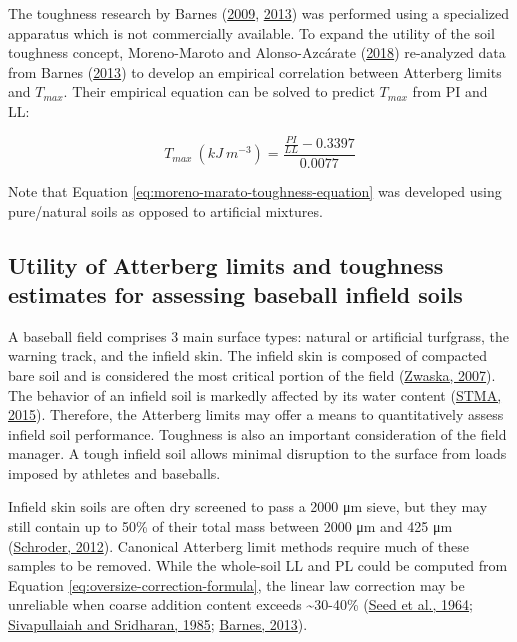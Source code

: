 \documentclass[
  letterpaper,
]{article}
\begin{document}
The toughness research by Barnes (\protect\hyperlink{ref-Barnes2009}{2009}, \protect\hyperlink{ref-Barnes2013}{2013}) was performed using a specialized apparatus which is not commercially available.
To expand the utility of the soil toughness concept, Moreno-Maroto and Alonso-Azcárate (\protect\hyperlink{ref-Moreno-Maroto2018}{2018}) re-analyzed data from Barnes (\protect\hyperlink{ref-Barnes2013}{2013}) to develop an empirical correlation between Atterberg limits and \(T_{max}\).
Their empirical equation can be solved to predict \(T_{max}\) from PI and LL:

\begin{equation}
T_{max}~(kJ~m^{-3}) = \frac{\frac{PI}{LL}-0.3397}{0.0077}
\label{eq:moreno-marato-toughness-equation}
\end{equation}

Note that Equation \eqref{eq:moreno-marato-toughness-equation} was developed using pure/natural soils as opposed to artificial mixtures.

\hypertarget{utility-of-atterberg-limits-and-toughness-estimates-for-assessing-baseball-infield-soils}{%
\subsection{Utility of Atterberg limits and toughness estimates for assessing baseball infield soils}\label{utility-of-atterberg-limits-and-toughness-estimates-for-assessing-baseball-infield-soils}}

A baseball field comprises 3 main surface types: natural or artificial turfgrass, the warning track, and the infield skin.
The infield skin is composed of compacted bare soil and is considered the most critical portion of the field (\protect\hyperlink{ref-Zwaska2007b}{Zwaska, 2007}).
The behavior of an infield soil is markedly affected by its water content (\protect\hyperlink{ref-STMA2015}{STMA, 2015}).
Therefore, the Atterberg limits may offer a means to quantitatively assess infield soil performance.
Toughness is also an important consideration of the field manager.
A tough infield soil allows minimal disruption to the surface from loads imposed by athletes and baseballs.

Infield skin soils are often dry screened to pass a 2000 μm sieve, but they may still contain up to 50\% of their total mass between 2000 μm and 425 μm (\protect\hyperlink{ref-Schroder2012}{Schroder, 2012}).
Canonical Atterberg limit methods require much of these samples to be removed.
While the whole-soil LL and PL could be computed from Equation \eqref{eq:oversize-correction-formula}, the linear law correction may be unreliable when coarse addition content exceeds \textasciitilde30-40\% (\protect\hyperlink{ref-Seed1964a}{Seed et al., 1964}; \protect\hyperlink{ref-Sivapullaiah1985}{Sivapullaiah and Sridharan, 1985}; \protect\hyperlink{ref-Barnes2013}{Barnes, 2013}).
\end{document}
